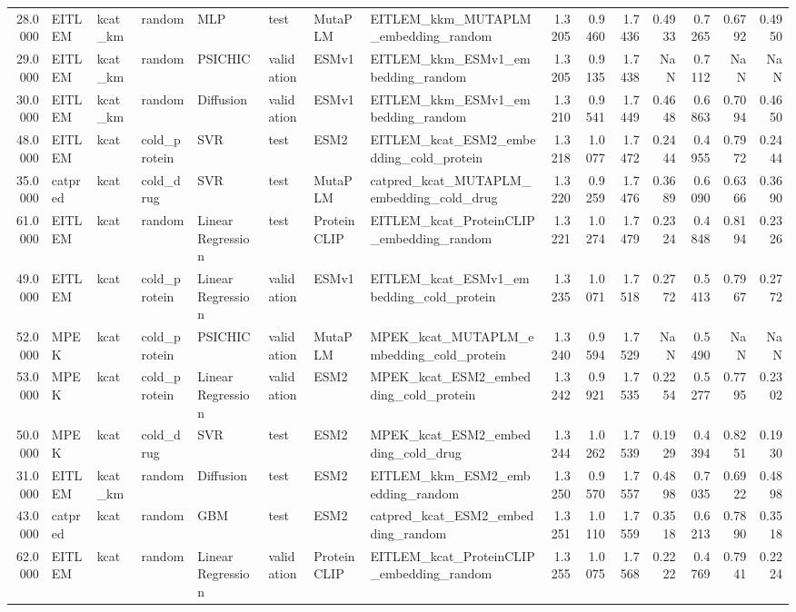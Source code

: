 \begin{tabular}{rlllllllrrrrrrr}
28.0000 & EITLEM & kcat_km & random & MLP & test & MutaPLM & EITLEM_kkm_MUTAPLM_embedding_random & 1.3205 & 0.9460 & 1.7436 & 0.4933 & 0.7265 & 0.6792 & 0.4950 \\
29.0000 & EITLEM & kcat_km & random & PSICHIC & validation & ESMv1 & EITLEM_kkm_ESMv1_embedding_random & 1.3205 & 0.9135 & 1.7438 & NaN & 0.7112 & NaN & NaN \\
30.0000 & EITLEM & kcat_km & random & Diffusion & validation & ESMv1 & EITLEM_kkm_ESMv1_embedding_random & 1.3210 & 0.9541 & 1.7449 & 0.4648 & 0.6863 & 0.7094 & 0.4650 \\
48.0000 & EITLEM & kcat & cold_protein & SVR & test & ESM2 & EITLEM_kcat_ESM2_embedding_cold_protein & 1.3218 & 1.0077 & 1.7472 & 0.2444 & 0.4955 & 0.7972 & 0.2444 \\
35.0000 & catpred & kcat & cold_drug & SVR & test & MutaPLM & catpred_kcat_MUTAPLM_embedding_cold_drug & 1.3220 & 0.9259 & 1.7476 & 0.3689 & 0.6090 & 0.6366 & 0.3690 \\
61.0000 & EITLEM & kcat & random & Linear Regression & test & ProteinCLIP & EITLEM_kcat_ProteinCLIP_embedding_random & 1.3221 & 1.0274 & 1.7479 & 0.2324 & 0.4848 & 0.8194 & 0.2326 \\
49.0000 & EITLEM & kcat & cold_protein & Linear Regression & validation & ESMv1 & EITLEM_kcat_ESMv1_embedding_cold_protein & 1.3235 & 1.0071 & 1.7518 & 0.2772 & 0.5413 & 0.7967 & 0.2772 \\
52.0000 & MPEK & kcat & cold_protein & PSICHIC & validation & MutaPLM & MPEK_kcat_MUTAPLM_embedding_cold_protein & 1.3240 & 0.9594 & 1.7529 & NaN & 0.5490 & NaN & NaN \\
53.0000 & MPEK & kcat & cold_protein & Linear Regression & validation & ESM2 & MPEK_kcat_ESM2_embedding_cold_protein & 1.3242 & 0.9921 & 1.7535 & 0.2254 & 0.5277 & 0.7795 & 0.2302 \\
50.0000 & MPEK & kcat & cold_drug & SVR & test & ESM2 & MPEK_kcat_ESM2_embedding_cold_drug & 1.3244 & 1.0262 & 1.7539 & 0.1929 & 0.4394 & 0.8251 & 0.1930 \\
31.0000 & EITLEM & kcat_km & random & Diffusion & test & ESM2 & EITLEM_kkm_ESM2_embedding_random & 1.3250 & 0.9570 & 1.7557 & 0.4898 & 0.7035 & 0.6922 & 0.4898 \\
43.0000 & catpred & kcat & random & GBM & test & ESM2 & catpred_kcat_ESM2_embedding_random & 1.3251 & 1.0110 & 1.7559 & 0.3518 & 0.6213 & 0.7890 & 0.3518 \\
62.0000 & EITLEM & kcat & random & Linear Regression & validation & ProteinCLIP & EITLEM_kcat_ProteinCLIP_embedding_random & 1.3255 & 1.0075 & 1.7568 & 0.2222 & 0.4769 & 0.7941 & 0.2224 \\

\end{tabular}

